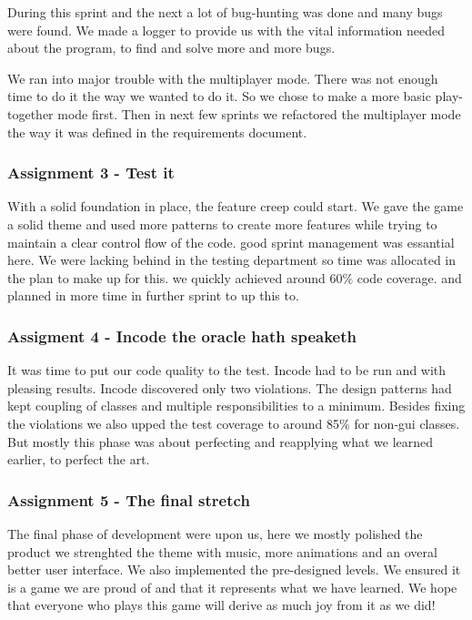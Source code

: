 \documentclass[a4paper]{article}
\begin{document}
During this sprint and the next a lot of bug-hunting was done and many bugs were found. We made a logger to provide us with the vital information needed about the program, to find and solve more and more bugs.

We ran into major trouble with the multiplayer mode. There was not enough time to do it the way we wanted to do it. So we chose to make a more basic play-together mode first. Then in next few sprints we refactored the multiplayer mode the way it was defined in the requirements document.

\subsubsection{Assignment 3 - Test it}
	With a solid foundation in place, the feature creep could start. We gave the game a solid theme and used more patterns to create more features while trying to maintain a clear control flow of the code. good sprint management was essantial here. We were lacking behind in the  testing department so time was allocated in the plan to make up for this.
 we quickly achieved around 60\% code coverage. and planned in more time in further sprint to up this to.
 
 \subsubsection{Assigment 4 - Incode the oracle hath speaketh}
 It was time to put our code quality to the test. Incode had to be run and with pleasing results. Incode discovered only two violations. The design patterns had kept coupling of classes and multiple responsibilities to a minimum.
 Besides fixing the violations we also upped the test coverage to around 85\% for non-gui classes. But mostly this phase was about perfecting and reapplying what we learned earlier, to perfect the art.
 
 \subsubsection{Assignment 5 - The final stretch}
 The final phase of development were upon us, here we mostly polished the product we strenghted the theme with music, more animations and an overal better user interface. We also implemented the pre-designed levels. We ensured it is a game we are proud of and that it represents what we have learned. We hope that everyone who plays this game will derive as much joy from it as we did!
\end{document}
